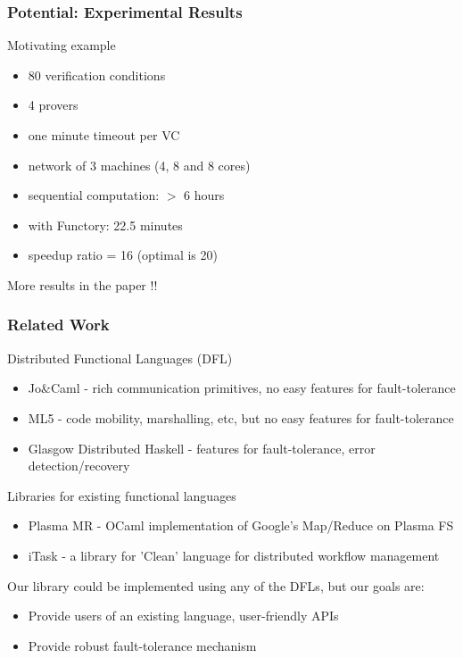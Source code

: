 \documentclass[xcolor=dvipsnames,8pt]{beamer}
\let\emph\alert
\begin{document}


\begin{frame}\frametitle {Potential: Experimental Results}
  Motivating example
  \begin{itemize}
  \item 80 verification conditions
  \item 4 provers
  \item one minute timeout per VC
  \item network of 3 machines (4, 8 and 8 cores)
  \end{itemize}


  \begin{itemize}
  \item sequential computation: \emph{$>$ 6 hours}
  \item with Functory: \emph{22.5 minutes}
  \item speedup ratio = \emph{16} (optimal is 20)
  \end{itemize}
  \begin{center}
  More results in the paper !!    
  \end{center}

\end{frame}


\begin{frame}\frametitle {Related Work}
  Distributed Functional Languages (DFL)
  \begin{itemize}
  \item Jo\&Caml - rich communication primitives, no easy features
    for fault-tolerance
  \item ML5 - code mobility, marshalling, etc, but no
    easy features for fault-tolerance
  \item Glasgow Distributed Haskell - features for fault-tolerance,
    error detection/recovery
  \end{itemize}
  Libraries for existing functional languages
  \begin{itemize}
  \item Plasma MR - OCaml implementation of Google's Map/Reduce on
    Plasma FS
  \item iTask - a library for 'Clean' language for distributed workflow management
  \end{itemize}

Our library could be implemented using any of the DFLs, but our goals
are:
\begin{itemize}
\item Provide users of an existing language, user-friendly APIs
\item Provide robust fault-tolerance mechanism 
\end{itemize}
  
\end{frame}
\end{document}
